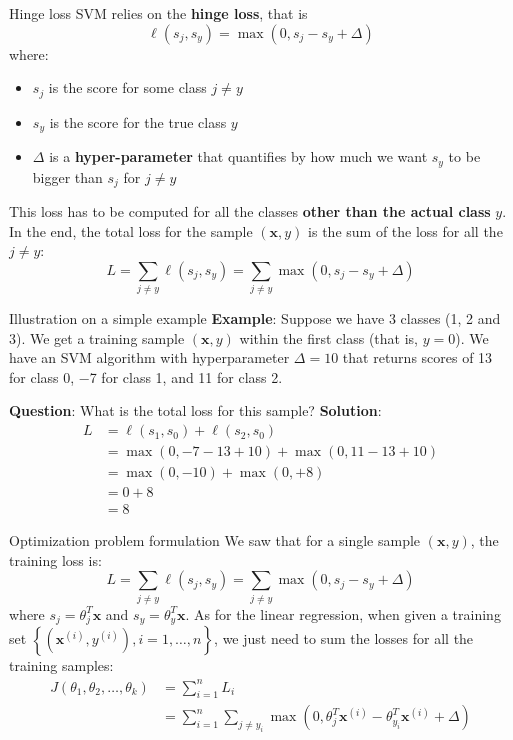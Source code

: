 \documentclass{beamer}
\newcommand{\1}[1]{\mathbbm{1}\left[#1\right]}
\newcommand{\yi}{y^{(i)}}
\newcommand{\bx}{\bm{x}}
\newcommand{\bxi}{\bx^{(i)}}
\newcommand{\pv}{\pause\vfill}
\begin{document}
\begin{frame}{Hinge loss}
SVM relies on the \textbf{hinge loss}, that is
\begin{equation*}
\ell(s_j, s_y) = \max(0, s_j - s_y + \Delta)
\end{equation*}
where:
\begin{itemize}
	\item $s_j$ is the score for some class $j \neq y$
	\item $s_y$ is the score for the true class $y$
	\item $\Delta$ is a \textbf{hyper-parameter} that quantifies by how much we want $s_y$ to be bigger than $s_j$ for $j \neq y$
\end{itemize}
\pv
This loss has to be computed for all the classes \textbf{other than the actual class }$y$. In the end, the total loss for the sample $(\bx, y)$ is the sum of the loss for all the $j \neq y$:
\begin{equation*}
L = \sum_{j \neq y} \ell(s_j, s_y) = \sum_{j \neq y} \max(0, s_j - s_y + \Delta)
\end{equation*}
\end{frame}

\begin{frame}{Illustration on a simple example}
\textbf{Example}: Suppose we have 3 classes (1, 2 and 3). We get a training sample $(\bx, y)$ within the first class (that is, $y = 0$). We have an SVM algorithm with hyperparameter $\Delta = 10$ that returns scores of 13 for class 0, −7 for class 1, and 11 for class 2. 

\textbf{Question}: What is the total loss for this sample?
\pv
\textbf{Solution}: 
\begin{equation*}
\begin{split}
L 	&=  \ell(s_1, s_0) + \ell(s_2, s_0) \\
	&= \max(0,−7−13+10) + \max(0,11−13+10) \\
	&= \max(0, -10) + \max(0, +8) \\
	&= 0 + 8 \\
	&= 8
\end{split}
\end{equation*}
\end{frame}

\begin{frame}{Optimization problem formulation}
We saw that for a single sample $(\bx, y)$, the training loss is:
\begin{equation*}
L = \sum_{j \neq y} \ell(s_j, s_y) = \sum_{j \neq y} \max(0, s_j - s_y + \Delta)
\end{equation*}
where $s_j = \theta_j^T \bx$ and $s_y = \theta_y^T \bx$.
\pv
As for the linear regression, when given a training set $\left\{ (\bxi, \yi), i =1, \dots, n\right\}$, we just need to sum the losses for all the training samples:
\begin{equation*}
\begin{split}
J(\theta_1, \theta_2, \dots, \theta_k) 
	&= \sum_{i = 1}^n L_i \\
	&= \sum_{i = 1}^n \sum_{j \neq y_i} \max(0, \theta_j^T\bxi - \theta_{y_i}^T\bxi + \Delta)
\end{split}
\end{equation*}
\end{frame}
\end{document}
